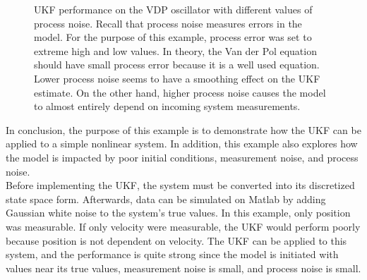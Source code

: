 \begin{figure}[!ht]
  \centering
  \hfill
  \caption{UKF performance on the VDP oscillator with different values of process noise.
  Recall that process noise measures errors in the model. For the purpose of this example, process error was set to extreme high and low values. In theory, the Van der Pol equation should have small process error because it is a well used equation. Lower process noise seems to have a smoothing effect on the UKF estimate. On the other hand, higher process noise causes the model to almost entirely depend on incoming system measurements.}
  \end{figure}
  
\newpage

\noindent In conclusion, the purpose of this example is to demonstrate how the UKF can be applied to a simple nonlinear system. In addition, this example also explores how the model is impacted by poor initial conditions, measurement noise, and process noise. \\

\noindent Before implementing the UKF, the system must be converted into its discretized state space form. Afterwards, data can be simulated on Matlab by adding Gaussian white noise to the system's true values. In this example, only position was measurable. If only velocity were measurable, the UKF would perform poorly because position is not dependent on velocity. The UKF can be applied to this system, and the performance is quite strong since the model is initiated with values near its true values, measurement noise is small, and process noise is small. \\

